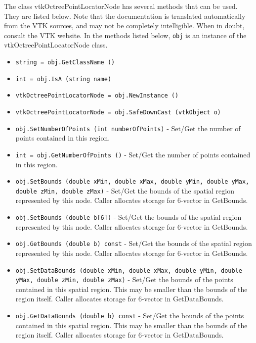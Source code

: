 The class vtkOctreePointLocatorNode has several methods that can be used.
  They are listed below.
Note that the documentation is translated automatically from the VTK sources,
and may not be completely intelligible.  When in doubt, consult the VTK website.
In the methods listed below, \verb|obj| is an instance of the vtkOctreePointLocatorNode class.
\begin{itemize}
\item  \verb|string = obj.GetClassName ()|

\item  \verb|int = obj.IsA (string name)|

\item  \verb|vtkOctreePointLocatorNode = obj.NewInstance ()|

\item  \verb|vtkOctreePointLocatorNode = obj.SafeDownCast (vtkObject o)|

\item  \verb|obj.SetNumberOfPoints (int numberOfPoints)| -  Set/Get the number of points contained in this region.

\item  \verb|int = obj.GetNumberOfPoints ()| -  Set/Get the number of points contained in this region.

\item  \verb|obj.SetBounds (double xMin, double xMax, double yMin, double yMax, double zMin, double zMax)| -    Set/Get the bounds of the spatial region represented by this node.
   Caller allocates storage for 6-vector in GetBounds.

\item  \verb|obj.SetBounds (double b[6])| -    Set/Get the bounds of the spatial region represented by this node.
   Caller allocates storage for 6-vector in GetBounds.

\item  \verb|obj.GetBounds (double b) const| -    Set/Get the bounds of the spatial region represented by this node.
   Caller allocates storage for 6-vector in GetBounds.

\item  \verb|obj.SetDataBounds (double xMin, double xMax, double yMin, double yMax, double zMin, double zMax)| -    Set/Get the bounds of the points contained in this spatial region.
   This may be smaller than the bounds of the region itself.
   Caller allocates storage for 6-vector in GetDataBounds.

\item  \verb|obj.GetDataBounds (double b) const| -    Set/Get the bounds of the points contained in this spatial region.
   This may be smaller than the bounds of the region itself.
   Caller allocates storage for 6-vector in GetDataBounds.


\end{itemize}
